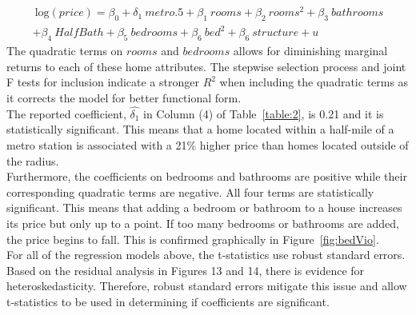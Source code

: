 \documentclass[12pt]{report}
\newcommand\tab[1][.60cm]{\hspace*{#1}}
\begin{document}
\begin{align}
\ \text{log}(price) = \beta_0 +\delta_1\ metro.5 + \beta_1 \ rooms + \beta_2\ rooms^2 + \beta_3\ bathrooms \nonumber \\ + \beta_4\ HalfBath + \beta_5\ bedrooms + \beta_6\ bed^2 + \beta_6\ structure + u \ 
\label{eqn:5}
\end{align}
The quadratic terms on $rooms$ and $bedrooms$ allows for diminishing marginal returns to each of these home attributes. The stepwise selection process and joint F tests for inclusion indicate a stronger $R^2$ when including the quadratic terms as it corrects the model for better functional form. \\
\tab The reported coefficient, $\hat{\delta_1}$ in Column (4) of Table~\ref{table:2}, is 0.21 and it is statistically significant. This means that a home located within a half-mile of a metro station is associated with a 21\% higher price than homes located outside of the radius. \\
\tab Furthermore, the coefficients on bedrooms and bathrooms are positive while their corresponding quadratic terms are negative. All four terms are statistically significant. This means that adding a bedroom or bathroom to a house increases its price but only up to a point. If too many bedrooms or bathrooms are added, the price begins to fall. This is confirmed graphically in Figure~\ref{fig:bedVio}.\\ \tab For all of the regression models above, the t-statistics use robust standard errors. Based on the residual analysis in Figures 13 and 14, there is evidence for heteroskedasticity. Therefore, robust standard errors mitigate this issue and allow t-statistics to be used in determining if coefficients are significant. 
\end{document}

